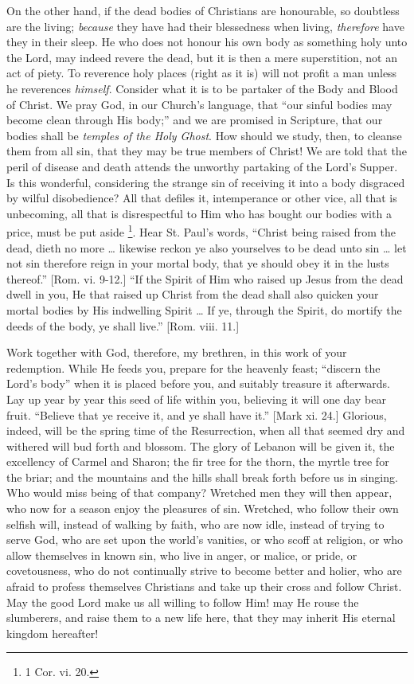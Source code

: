 On the other hand, if the dead bodies of Christians
are honourable, so doubtless are the living; \emph{because}
they have had their blessedness when living, \emph{therefore}
have they in their sleep. He who does not honour his own
body as something holy unto the Lord, may indeed revere
the dead, but it is then a mere superstition, not an act
of piety. To reverence holy places (right as it is) will
not profit a man unless he reverences \emph{himself}.
Consider what it is to be partaker of the Body and Blood
of Christ. We pray God, in our Church's language, that
``our sinful bodies may become clean through His
body;'' and we are promised in Scripture, that our
bodies shall be \emph{temples of the Holy Ghost}. How
should we study, then, to cleanse them from all sin, that
they may be true members of Christ! We are told that the
peril of disease and death attends the unworthy partaking
of the Lord's Supper. Is this wonderful, considering the
strange sin of receiving it into a body disgraced by
wilful disobedience? All that defiles it, intemperance or
other vice, all that is unbecoming, all that is
disrespectful to Him who has bought our bodies with a
price, must be put aside \footnote{1 Cor. vi. 20.}. Hear St.
Paul's words, ``Christ being raised from the dead,
dieth no more … likewise reckon ye also yourselves
to be dead unto sin … let not sin therefore reign in
your mortal body, that ye should obey it in the lusts
thereof.'' [Rom. vi. 9-12.] ``If the Spirit of
Him who raised up Jesus from the dead dwell in you, He
that raised up Christ from the dead shall also quicken
your mortal bodies by His indwelling Spirit … If ye,
through the Spirit, do mortify the deeds of the body, ye
shall live.'' [Rom. viii. 11.]

Work together with God, therefore, my brethren, in
this work of your redemption. While He feeds you, prepare
for the heavenly feast; ``discern the Lord's
body'' when it is placed before you, and suitably
treasure it afterwards. Lay up year by year this seed of
life within you, believing it will one day bear fruit.
``Believe that ye receive it, and ye shall have
it.'' [Mark xi. 24.] Glorious, indeed, will be the
spring time of the Resurrection, when all that seemed dry
and withered will bud forth and blossom. The glory of
Lebanon will be given it, the excellency of Carmel and
Sharon; the fir tree for the thorn, the myrtle tree for
the briar; and the mountains and the hills shall break
forth before us in singing. Who would miss being of that
company? Wretched men they will then appear, who now for
a season enjoy the pleasures of sin. Wretched, who follow
their own selfish will, instead of walking by faith, who
are now idle, instead of trying to serve God, who are set
upon the world's vanities, or who scoff at religion, or
who allow themselves in known sin, who live in anger, or
malice, or pride, or covetousness, who do not continually
strive to become better and holier, who are afraid to
profess themselves Christians and take up their cross and
follow Christ. May the good Lord make us all willing to
follow Him! may He rouse the slumberers, and raise them
to a new life here, that they may inherit His eternal
kingdom hereafter!

